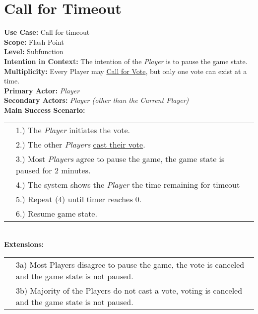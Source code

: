 \documentclass{article}
\begin{document}
	\section*{Call for Timeout}
	\textbf{Use Case:} Call for timeout\\
	\textbf{Scope:} Flash Point\\
	\textbf{Level:} Subfunction\\
	\textbf{Intention in Context:} The intention of the \textit{Player} is to pause the game state.\\
	\textbf{Multiplicity: } Every Player may \underline{Call for Vote}, but only one vote can exist at a time.\\
	\textbf{Primary Actor:} \textit{Player}\\
	\textbf{Secondary Actors:} \textit{Player (other than the Current Player)}\\
	\textbf{Main Success Scenario:}\\
	\begin{tabular}{l l}
		&1.) The \textit{Player} initiates the vote.\\
		&2.) The other \textit{Players} \underline{cast their vote}.\\
		&3.) Most \textit{Players} agree to pause the game, the game state is paused for 2 minutes.\\
		&4.) The system shows the \textit{Player} the time remaining for timeout\\
		&5.) Repeat (4) until timer reaches 0.\\
		&6.) Resume game state.\\
	\end{tabular}\\
	\textbf{Extensions:}\\
	\begin{tabular}{l l}
		&3a) Most Players disagree to pause the game, the vote is canceled and the game state is not paused.\\
		&3b) Majority of the Players do not cast a vote, voting is canceled and the game state is not paused.
	\end{tabular}
\end{document}
